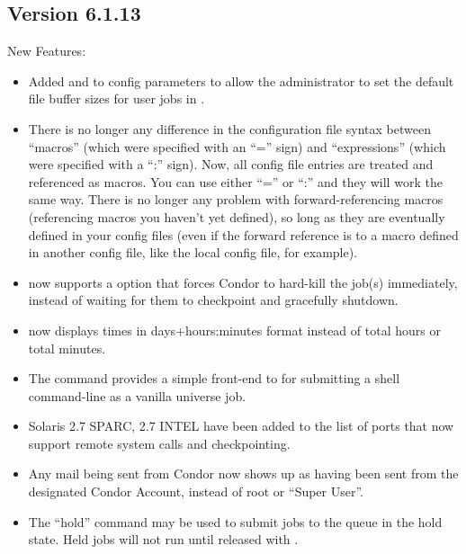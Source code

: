 \subsection{\label{sec:New-6-1-13}Version 6.1.13}

\noindent New Features:

\begin{itemize}

\item Added  and
 to config parameters to allow
the administrator to set the default file buffer sizes for user jobs
in .

\item There is no longer any difference in the configuration file
syntax between ``macros'' (which were specified with an ``='' sign)
and ``expressions'' (which were specified with a ``:'' sign).  
Now, all config file entries are treated and referenced as macros. 
You can use either ``='' or ``:'' and they will work the same way. 
There is no longer any problem with forward-referencing macros
(referencing macros you haven't yet defined), so long as they are
eventually defined in your config files (even if the forward reference
is to a macro defined in another config file, like the local config
file, for example).

\item {} now supports a  option that forces
Condor to hard-kill the job(s) immediately, instead of waiting for
them to checkpoint and gracefully shutdown.

\item {} now displays times in days+hours:minutes format
instead of total hours or total minutes.

\item The  command provides a simple front-end to
 for submitting a shell command-line as a vanilla
universe job.

\item Solaris 2.7 SPARC, 2.7 INTEL have been added to the
list of ports that now support remote system calls and checkpointing.

\item Any mail being sent from Condor now shows up as having been sent from
the designated Condor Account, instead of root or ``Super User''.

\item The  ``hold'' command may be used to submit jobs
to the queue in the hold state.  Held jobs will not run until released
with .


\end{itemize}
